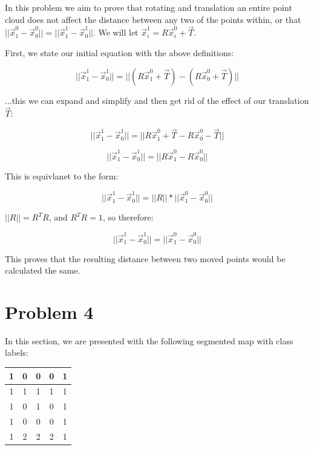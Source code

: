 \documentclass{article}
\begin{document}
In this problem we aim to prove that rotating and translation an entire point cloud does not affect the distance between any two of the points within, or that $||\vec{x}^0_1-\vec{x}^0_0|| = ||\vec{x}^1_1 - \vec{x}^1_0||$. We will let $\vec{x}^1_i=R\vec{x}^0_i + \vec{T}$.

First, we state our initial equation with the above definitions:

\begin{equation}
    ||\vec{x}^1_1 - \vec{x}^1_0|| = ||(R\vec{x}^0_1+\vec{T}) - (R\vec{x}^0_0 + \vec{T})||
\end{equation}

\noindent ...this we can expand and simplify and then get rid of the effect of our translation $\vec{T}$:

\begin{equation}
    ||\vec{x}^1_1 - \vec{x}^1_0|| = ||R\vec{x}^0_1+\vec{T} - R\vec{x}^0_0 - \vec{T}||
\end{equation}

\begin{equation}
    ||\vec{x}^1_1 - \vec{x}^1_0|| = ||R\vec{x}^0_1 - R\vec{x}^0_0||
\end{equation}

\noindent This is equivlanet to the form:

\begin{equation}
    ||\vec{x}^1_1 - \vec{x}^1_0|| = ||R|| * ||\vec{x}^0_1 - \vec{x}^0_0||
\end{equation}

\noindent $||R|| = R^TR$, and $R^TR = 1$, so therefore:

\begin{equation}
    ||\vec{x}^1_1 - \vec{x}^1_0|| = ||\vec{x}^0_1 - \vec{x}^0_0||
\end{equation}

\noindent This proves that the resulting distance between two moved points would be calculated the same.


\section*{Problem 4}

In this section, we are presented with the following segmented map with class labels:

\begin{center}
    \begin{tabular}{ | c | c | c | c | c | }
        \hline
        1 & 0 & 0 & 0 & 1 \\ 
        \hline
        1 & 1 & 1 & 1 & 1 \\ 
        \hline
        1 & 0 & 1 & 0 & 1 \\ 
        \hline
        1 & 0 & 0 & 0 & 1 \\ 
        \hline
        1 & 2 & 2 & 2 & 1 \\ 
        \hline  
    \end{tabular}
\end{center}
\end{document}
